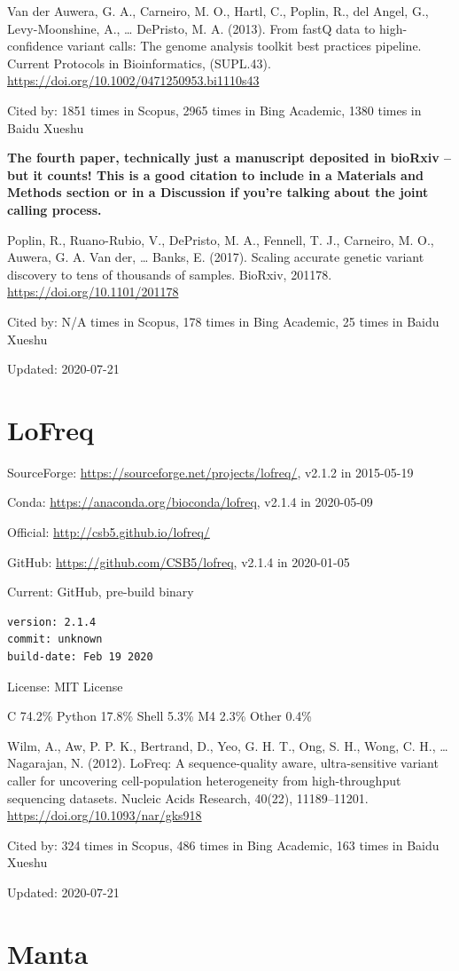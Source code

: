 \documentclass[]{article}
\newcommand{\cb}[3]{\par Cited by: {\color{blue}\Huge #1} times in Scopus, {\color{blue}\Huge #2} times in Bing Academic, {\color{blue}\Huge #3} times in Baidu Xueshu}
\begin{document}
Van der Auwera, G. A., Carneiro, M. O., Hartl, C., Poplin, R., del Angel, G., Levy-Moonshine, A., … DePristo, M. A. (2013). From fastQ data to high-confidence variant calls: The genome analysis toolkit best practices pipeline. Current Protocols in Bioinformatics, (SUPL.43). \url{https://doi.org/10.1002/0471250953.bi1110s43}\cb{1851}{2965}{1380}

\textbf{The fourth paper, technically just a manuscript deposited in bioRxiv -- but it counts! This is a good citation to include in a Materials and Methods section or in a Discussion if you're talking about the joint calling process.}

Poplin, R., Ruano-Rubio, V., DePristo, M. A., Fennell, T. J., Carneiro, M. O., Auwera, G. A. Van der, … Banks, E. (2017). Scaling accurate genetic variant discovery to tens of thousands of samples. BioRxiv, 201178. \url{https://doi.org/10.1101/201178}\cb{N/A}{178}{25}

Updated: 2020-07-21

\section{LoFreq}

SourceForge: \url{https://sourceforge.net/projects/lofreq/}, v2.1.2 in 2015-05-19

Conda: \url{https://anaconda.org/bioconda/lofreq}, v2.1.4 in 2020-05-09

Official: \url{http://csb5.github.io/lofreq/}

GitHub: \url{https://github.com/CSB5/lofreq}, v2.1.4 in 2020-01-05

Current: GitHub, pre-build binary

\begin{verbatim}
version: 2.1.4
commit: unknown
build-date: Feb 19 2020
\end{verbatim}

License: MIT License

C 74.2\% Python 17.8\% Shell 5.3\% M4 2.3\% Other 0.4\%

Wilm, A., Aw, P. P. K., Bertrand, D., Yeo, G. H. T., Ong, S. H., Wong, C. H., … Nagarajan, N. (2012). LoFreq: A sequence-quality aware, ultra-sensitive variant caller for uncovering cell-population heterogeneity from high-throughput sequencing datasets. Nucleic Acids Research, 40(22), 11189–11201. \url{https://doi.org/10.1093/nar/gks918}\cb{324}{486}{163}

Updated: 2020-07-21
\section{Manta}
\end{document}
